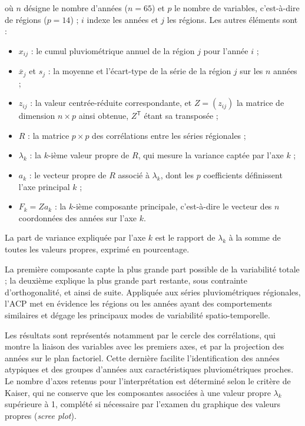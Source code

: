 \documentclass[12pt,a4paper]{report}
\begin{document}
où $n$ désigne le nombre d'années ($n=65$) et $p$ le nombre de variables, c'est-à-dire de régions ($p=14$) ; $i$ indexe les années et $j$ les régions. Les autres éléments sont :
\begin{itemize}
  \item $x_{ij}$ : le cumul pluviométrique annuel de la région $j$ pour l'année $i$ ;
  \item $\overline{x}_j$ et $s_j$ : la moyenne et l'écart-type de la série de la région $j$ sur les $n$ années ;
  \item $z_{ij}$ : la valeur centrée-réduite correspondante, et $Z=(z_{ij})$ la matrice de dimension $n\times p$ ainsi obtenue, $Z^{\mathsf T}$ étant sa transposée ;
  \item $R$ : la matrice $p\times p$ des corrélations entre les séries régionales ;
  \item $\lambda_k$ : la $k$-ième valeur propre de $R$, qui mesure la variance captée par l'axe $k$ ;
  \item $a_k$ : le vecteur propre de $R$ associé à $\lambda_k$, dont les $p$ coefficients définissent l'axe principal $k$ ;
  \item $F_k=Za_k$ : la $k$-ième composante principale, c'est-à-dire le vecteur des $n$ coordonnées des années sur l'axe $k$.
\end{itemize}
La part de variance expliquée par l'axe $k$ est le rapport de $\lambda_k$ à la somme de toutes les valeurs propres, exprimé en pourcentage.

La première composante capte la plus grande part possible de la variabilité totale ; la deuxième explique la plus grande part restante, sous contrainte d'orthogonalité, et ainsi de suite. Appliquée aux séries pluviométriques régionales, l'ACP met en évidence les régions ou les années ayant des comportements similaires et dégage les principaux modes de variabilité spatio-temporelle.

Les résultats sont représentés notamment par le cercle des corrélations, qui montre la liaison des variables avec les premiers axes, et par la projection des années sur le plan factoriel. Cette dernière facilite l'identification des années atypiques et des groupes d'années aux caractéristiques pluviométriques proches. Le nombre d'axes retenus pour l'interprétation est déterminé selon le critère de Kaiser, qui ne conserve que les composantes associées à une valeur propre $\lambda_k$ supérieure à 1, complété si nécessaire par l'examen du graphique des valeurs propres (\textit{scree plot}).
\end{document}
